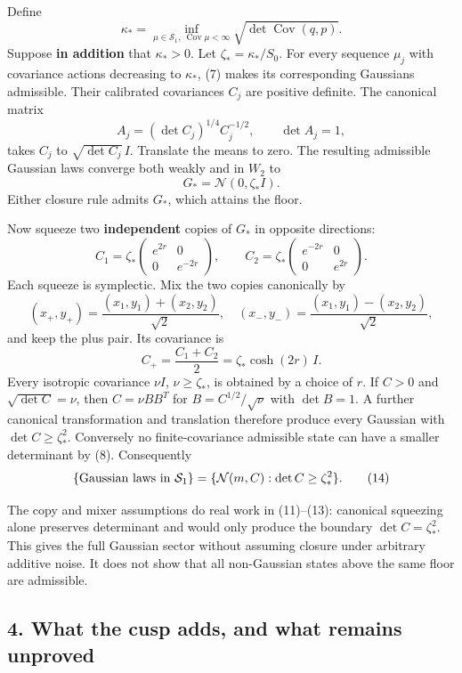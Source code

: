 \documentclass[11pt,a4paper]{article}
\begin{document}
Define \[
 \kappa_*=\inf_{\mu\in\mathcal S_1,\ \operatorname{Cov}\mu<\infty}
          \sqrt{\det\operatorname{Cov}(q,p)}.\tag{8}
\] Suppose \textbf{in addition} that \(\kappa_*>0\). Let
\(\zeta_*=\kappa_*/S_0\). For every sequence \(\mu_j\) with covariance
actions decreasing to \(\kappa_*\), (7) makes its corresponding
Gaussians admissible. Their calibrated covariances \(C_j\) are positive
definite. The canonical matrix
\[A_j=(\det C_j)^{1/4}C_j^{-1/2},\qquad \det A_j=1,\tag{9}\] takes
\(C_j\) to \(\sqrt{\det C_j}\,I\). Translate the means to zero. The
resulting admissible Gaussian laws converge both weakly and in \(W_2\)
to \[G_*=\mathcal N(0,\zeta_* I).\tag{10}\] Either closure rule admits
\(G_*\), which attains the floor.

Now squeeze two \textbf{independent} copies of \(G_*\) in opposite
directions: \[
 C_1=\zeta_*\begin{pmatrix}e^{2r}&0\\0&e^{-2r}\end{pmatrix},
 \qquad
 C_2=\zeta_*\begin{pmatrix}e^{-2r}&0\\0&e^{2r}\end{pmatrix}.
 \tag{11}
\] Each squeeze is symplectic. Mix the two copies canonically by \[
 (x_+,y_+)=\frac{(x_1,y_1)+(x_2,y_2)}{\sqrt2},\quad
 (x_-,y_-)=\frac{(x_1,y_1)-(x_2,y_2)}{\sqrt2},\tag{12}
\] and keep the plus pair. Its covariance is
\[C_+=\frac{C_1+C_2}{2}=\zeta_*\cosh(2r)\,I.\tag{13}\] Every isotropic
covariance \(\nu I\), \(\nu\ge\zeta_*\), is obtained by a choice of
\(r\). If \(C>0\) and \(\sqrt{\det C}=\nu\), then \(C=\nu BB^T\) for
\(B=C^{1/2}/\sqrt\nu\) with \(\det B=1\). A further canonical
transformation and translation therefore produce every Gaussian with
\(\det C\ge\zeta_*^2\). Conversely no finite-covariance admissible state
can have a smaller determinant by (8). Consequently \[
 \{\hbox{Gaussian laws in }\mathcal S_1\}
 =\{\mathcal N(m,C):\det C\ge\zeta_*^2\}. \tag{14}
\]

The copy and mixer assumptions do real work in (11)--(13): canonical
squeezing alone preserves determinant and would only produce the
boundary \(\det C=\zeta_*^2\). This gives the full Gaussian sector
without assuming closure under arbitrary additive noise. It does not
show that all non-Gaussian states above the same floor are admissible.

\hypertarget{what-the-cusp-adds-and-what-remains-unproved}{%
\subsection{4. What the cusp adds, and what remains
unproved}\label{what-the-cusp-adds-and-what-remains-unproved}}
\end{document}
